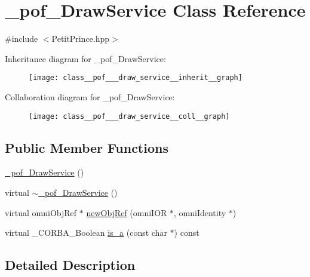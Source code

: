 \hypertarget{class__pof___draw_service}{}\section{\+\_\+pof\+\_\+\+Draw\+Service Class Reference}
\label{class__pof___draw_service}


{\ttfamily \#include $<$Petit\+Prince.\+hpp$>$}



Inheritance diagram for \+\_\+pof\+\_\+\+Draw\+Service\+:
\nopagebreak
\begin{figure}[H]
\begin{center}
\leavevmode
\texttt{[image: class\_\_pof\_\_\_draw\_service\_\_inherit\_\_graph]}
\end{center}
\end{figure}


Collaboration diagram for \+\_\+pof\+\_\+\+Draw\+Service\+:
\nopagebreak
\begin{figure}[H]
\begin{center}
\leavevmode
\texttt{[image: class\_\_pof\_\_\_draw\_service\_\_coll\_\_graph]}
\end{center}
\end{figure}
\subsection*{Public Member Functions}
\begin{DoxyCompactItemize}
\item 
\hyperlink{class__pof___draw_service_aee04921a7d18e0092ee3eb65cc19fac0}{\+\_\+pof\+\_\+\+Draw\+Service} ()
\item 
virtual \hyperlink{class__pof___draw_service_a8eaecc74531d24fed260cb30c752798b}{$\sim$\+\_\+pof\+\_\+\+Draw\+Service} ()
\item 
virtual omni\+Obj\+Ref $\ast$ \hyperlink{class__pof___draw_service_a11e4f893d46b58731f8ea17ffee147b8}{new\+Obj\+Ref} (omni\+I\+OR $\ast$, omni\+Identity $\ast$)
\item 
virtual \+\_\+\+C\+O\+R\+B\+A\+\_\+\+Boolean \hyperlink{class__pof___draw_service_a6d03d31287dce5a319832d45d736466a}{is\+\_\+a} (const char $\ast$) const 
\end{DoxyCompactItemize}


\subsection{Detailed Description}


